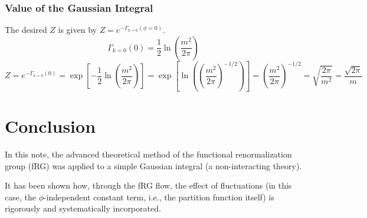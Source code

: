 \documentclass[uplatex,a4j,12pt,dvipdfmx]{jsarticle}
\begin{document}
\subsubsection{Value of the Gaussian Integral}

The desired $Z$ is given by $Z = e^{-\Gamma_{k=0}(\phi=0)}$.
\[
	\Gamma_{k=0}(0) = \frac{1}{2} \ln \left( \frac{m^2}{2\pi} \right)
\]
\[
	Z = e^{-\Gamma_{k=0}(0)} = \exp \left[ -\frac{1}{2} \ln \left( \frac{m^2}{2\pi} \right) \right]
	= \exp \left[ \ln \left( \left(\frac{m^2}{2\pi}\right)^{-1/2} \right) \right]
	= \left( \frac{m^2}{2\pi} \right)^{-1/2}
	= \sqrt{\frac{2\pi}{m^2}}
	= \frac{\sqrt{2\pi}}{m}
\]
\section{Conclusion}

In this note, the advanced theoretical method of the functional renormalization group (fRG)
was applied to a simple Gaussian integral (a non-interacting theory).

It has been shown how, through the fRG flow, the effect of fluctuations
(in this case, the $\phi$-independent constant term, i.e., the partition function itself)
is rigorously and systematically incorporated.
\end{document}
